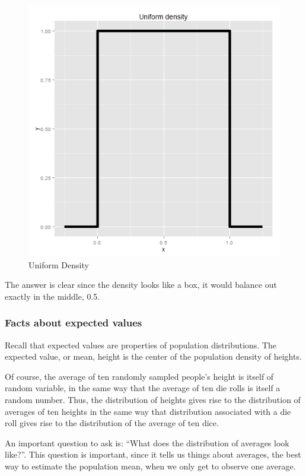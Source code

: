 \documentclass[]{article}
\begin{document}
\begin{figure}[htbp]
\centering
\includegraphics{LeanPub/images/uniform-1.png}
\caption{Uniform Density}
\end{figure}

The answer is clear since the density looks like a box, it would balance
out exactly in the middle, 0.5.

\subsubsection{Facts about expected
values}\label{facts-about-expected-values}

Recall that expected values are properties of population distributions.
The expected value, or mean, height is the center of the population
density of heights.

Of course, the average of ten randomly sampled people's height is itself
of random variable, in the same way that the average of ten die rolls is
itself a random number. Thus, the distribution of heights gives rise to
the distribution of averages of ten heights in the same way that
distribution associated with a die roll gives rise to the distribution
of the average of ten dice.

An important question to ask is: ``What does the distribution of
averages look like?''. This question is important, since it tells us
things about averages, the best way to estimate the population mean,
when we only get to observe one average.
\end{document}
